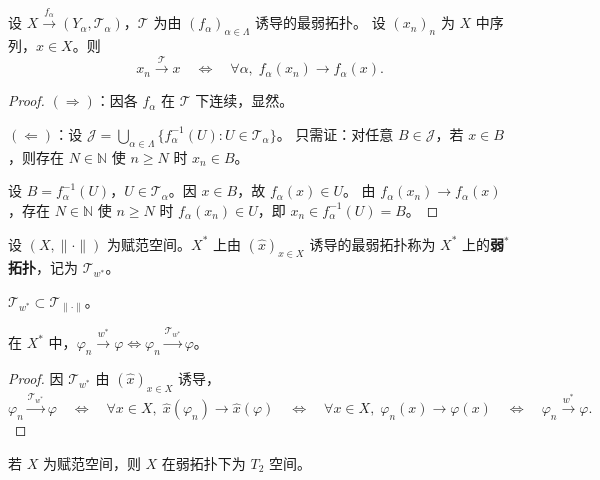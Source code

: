 \documentclass[lang=cn,a4paper,newtx,section]{elegantbook}
\begin{document}
\begin{proposition}
  设 $X\xrightarrow{f_\alpha}(Y_\alpha,\mathcal{T}_\alpha)$，$\mathcal{T}$ 为由 $(f_\alpha)_{\alpha\in\Lambda}$ 诱导的最弱拓扑。
  设 $(x_n)_n$ 为 $X$ 中序列，$x\in X$。则
  \[
    x_n\xrightarrow{\mathcal{T}}x\quad\Longleftrightarrow\quad\forall\alpha,\;f_\alpha(x_n)\to f_\alpha(x).
  \]
\end{proposition}

\begin{proof}
  $(\Rightarrow)$：因各 $f_\alpha$ 在 $\mathcal{T}$ 下连续，显然。

  $(\Leftarrow)$：设 $\mathcal{J}=\bigcup_{\alpha\in\Lambda}\{f_\alpha^{-1}(U):U\in\mathcal{T}_\alpha\}$。
  只需证：对任意 $B\in\mathcal{J}$，若 $x\in B$，则存在 $N\in\mathbb{N}$ 使 $n\ge N$ 时 $x_n\in B$。

  设 $B=f_\alpha^{-1}(U)$，$U\in\mathcal{T}_\alpha$。因 $x\in B$，故 $f_\alpha(x)\in U$。
  由 $f_\alpha(x_n)\to f_\alpha(x)$，存在 $N\in\mathbb{N}$ 使 $n\ge N$ 时 $f_\alpha(x_n)\in U$，即 $x_n\in f_\alpha^{-1}(U)=B$。
\end{proof}

\begin{definition}[弱$^*$拓扑]
  设 $(X,\|\cdot\|)$ 为赋范空间。$X^*$ 上由 $(\hat{x})_{x\in X}$ 诱导的最弱拓扑称为 $X^*$ 上的\textbf{弱$^*$拓扑}，记为 $\mathcal{T}_{w^*}$。
\end{definition}

\begin{proposition}
  $\mathcal{T}_{w^*}\subset\mathcal{T}_{\|\cdot\|}$。
\end{proposition}

\begin{proposition}
  在 $X^*$ 中，$\varphi_n\xrightarrow{w^*}\varphi\Longleftrightarrow\varphi_n\xrightarrow{\mathcal{T}_{w^*}}\varphi$。
\end{proposition}

\begin{proof}
  因 $\mathcal{T}_{w^*}$ 由 $(\hat{x})_{x\in X}$ 诱导，
  \[
    \varphi_n\xrightarrow{\mathcal{T}_{w^*}}\varphi\quad\Longleftrightarrow\quad\forall x\in X,\;\hat{x}(\varphi_n)\to\hat{x}(\varphi)\quad\Longleftrightarrow\quad\forall x\in X,\;\varphi_n(x)\to\varphi(x)\quad\Longleftrightarrow\quad\varphi_n\xrightarrow{w^*}\varphi.
  \]
\end{proof}

\begin{proposition}
  若 $X$ 为赋范空间，则 $X$ 在弱拓扑下为 $T_2$ 空间。
\end{proposition}
\end{document}
